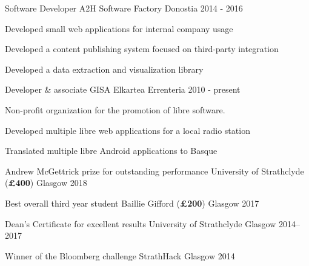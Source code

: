 \documentclass[11pt, a4paper]{awesome-cv}
\begin{document}
\begin{cventries}
    \cventry
      {Software Developer} %
      {A2H Software Factory} %
      {Donostia} %
      {2014 - 2016} %
      {
        \begin{cvitems} %
          \item {Developed small web applications for internal company usage}
          \item {Developed a content publishing system focused on third-party
              integration}
          \item {Developed a data extraction and visualization library}
        \end{cvitems}
      }

    \cventry
      {Developer \& associate} %
      {GISA Elkartea}
      {Errenteria} %
      {2010 - present} %
      {
        Non-profit organization for the promotion of libre
        software.\vspace{1.1\baselineskip}
        \begin{cvitems} %
          \item {Developed multiple libre web applications for a local radio
              station}
          \item {Translated multiple libre Android applications to Basque}
        \end{cvitems}
      }

\end{cventries}


\begin{cvhonors}
  \cvhonor
  {Andrew McGettrick prize for outstanding performance} %
  {University of Strathclyde (\textbf{£400})} %
  {Glasgow} %
  {2018} %
  
  \cvhonor
  {Best overall third year student} %
  {Baillie Gifford (\textbf{£200})} %
  {Glasgow} %
  {2017} %
  
  \cvhonor
  {Dean's Certificate for excellent results} %
  {University of Strathclyde} %
  {Glasgow} %
  {2014--2017} %
  
  \cvhonor
  {Winner of the Bloomberg challenge} %
  {StrathHack} %
  {Glasgow} %
  {2014} %
\end{cvhonors}
\end{document}
